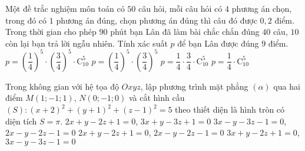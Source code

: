 \begin{ex}%
Một đề trắc nghiệm môn toán có $50$ câu hỏi, mỗi câu hỏi có $4$ phương án chọn, trong đó có $1$ phương án đúng, chọn phương án đúng thì câu đó được $0{,2}$ điểm. Trong thời gian cho phép $90$ phút bạn Lân đã làm bài chắc chắn đúng $40$ câu, $10$ còn lại bạn trả lời ngẫu nhiên. Tính xác suất $p$ để bạn Lân được đúng $9$ điểm.   
\choice
{\True $p=\left (\dfrac{1}{4}\right )^5 \cdot \left (\dfrac{3}{4}\right )^5 \cdot \mathrm{C}_{10}^5$}
{$p=\left (\dfrac{1}{4}\right )^5 \cdot \left (\dfrac{3}{4}\right )^5$}
{$p=\dfrac{1}{4} \cdot \dfrac{3}{4} \cdot \mathrm{C}_{10}^5$}
{$p=\dfrac{1}{4} \cdot \mathrm{C}_{10}^5$}
\end{ex}

\begin{ex}%
Trong không gian với hệ tọa độ $Oxyz$, lập phương trình mặt phẳng $(\alpha)$ qua hai điểm $M(1;-1;1)$, $N(0;-1;0)$ và cắt hình cầu $(S) \colon (x+2)^2+(y+1)^2+(z-1)^2=5$ theo thiết diện là hình tròn có diện tích $S=\pi$. 
\choice
{$2x+y-2z+1=0$, $3x+y-3z+1=0$}
{$3x-y-3z-1=0$, $2x-y-2z-1=0$}
{\True $2x+y-2z+1=0$, $2x-y-2z-1=0$}
{$3x+y-2z+1=0$, $3x-y-3z-1=0$}
\end{ex}


